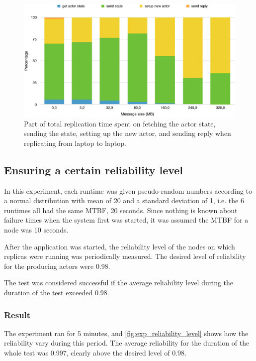 \documentclass{cslthse-msc}
\begin{document}
\begin{figure}[!hbt]
\centering
\includegraphics[scale=0.5]{images/results/replication_time_percentages_laptop.pdf} 
\caption{Part of total replication time spent on fetching the actor state, sending the state, setting up the new actor, and sending reply when replicating from laptop to laptop.}\label{fig:replication_time_percentages_laptop}
\end{figure}

\subsection{Ensuring a certain reliability level} \label{sec:eval_rel_level}
In this experiment, each runtime was given pseudo-random numbers according to a normal distribution with mean of 20 and a standard deviation of 1, i.e. the 6 runtimes all had the same MTBF, 20 seconds. Since nothing is known about failure times when the system first was started, it was assumed the MTBF for a node was 10 seconds.

After the application was started, the reliability level of the nodes on which replicas were running was periodically measured. The desired level of reliability for the producing actors were 0.98.

The test was considered successful if the average reliability level during the duration of the test exceeded 0.98.

\subsubsection*{Result}
The experiment ran for 5 minutes, and \cref{fig:exp_reliability_level} shows how the reliability vary during this period. The average reliability for the duration of the whole test was 0.997, clearly above the desired level of 0.98.
\end{document}
